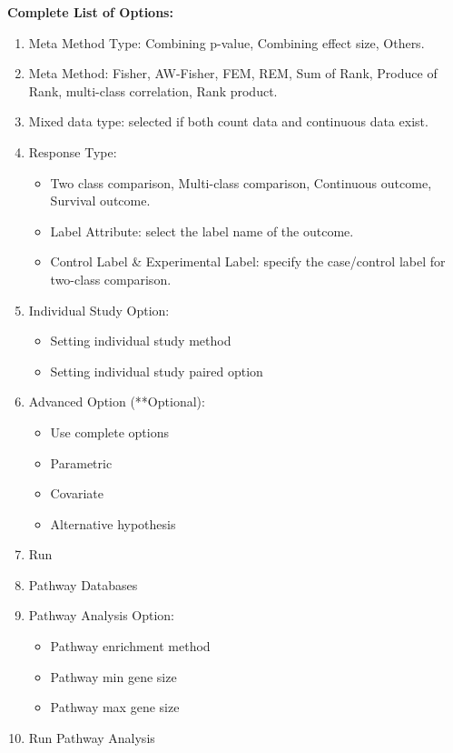\textbf{Complete List of Options:} 

\begin{enumerate}
  \item Meta Method Type: Combining p-value, Combining effect size, Others.
  \item Meta Method: Fisher, AW-Fisher, FEM, REM, Sum of Rank, Produce of Rank, multi-class correlation, Rank product. 
  \item Mixed data type: selected if both count data and continuous data exist.
  \item Response Type:
   \begin{itemize}
     \item Two class comparison, Multi-class comparison, Continuous outcome, Survival outcome.
     \item Label Attribute: select the label name of the outcome.
     \item Control Label \& Experimental Label: specify the case/control label for two-class comparison.
    \end{itemize}
   \item Individual Study Option:
     \begin{itemize}
     \item Setting individual study method
     \item Setting individual study paired option
    \end{itemize} 
   \item Advanced Option (**Optional):
     \begin{itemize}
      \item Use complete options
      \item Parametric
      \item Covariate
      \item Alternative hypothesis
    \end{itemize} 
    \item Run
    \item Pathway Databases
    \item Pathway Analysis Option:
         \begin{itemize}
      \item Pathway enrichment method
      \item Pathway min gene size
      \item Pathway max gene size
    \end{itemize} 
    \item Run Pathway Analysis
\end{enumerate}



